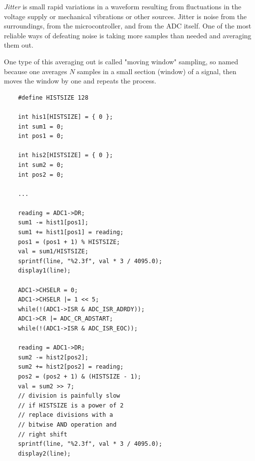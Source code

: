 \emph{Jitter} is small rapid variations in a waveform resulting from
fluctuations in the voltage supply or mechanical vibrations or other
sources. Jitter is noise from the surroundings, from the microcontroller,
and from the ADC itself. One of the most reliable ways of defeating noise
is taking more samples than needed and averaging them out.

One type of this averaging out is called "moving window" sampling, so named
because one averages $N$ samples in a small section (window) of a signal,
then moves the window by one and repeats the process.

\begin{lstlisting}
    #define HISTSIZE 128

    int his1[HISTSIZE] = { 0 };
    int sum1 = 0;
    int pos1 = 0;
    
    int his2[HISTSIZE] = { 0 };
    int sum2 = 0;
    int pos2 = 0;

    ... 

    reading = ADC1->DR;
    sum1 -= hist1[pos1];
    sum1 += hist1[pos1] = reading;
    pos1 = (pos1 + 1) % HISTSIZE;
    val = sum1/HISTSIZE;
    sprintf(line, "%2.3f", val * 3 / 4095.0);
    display1(line);

    ADC1->CHSELR = 0;
    ADC1->CHSELR |= 1 << 5;
    while(!(ADC1->ISR & ADC_ISR_ADRDY));
    ADC1->CR |= ADC_CR_ADSTART;
    while(!(ADC1->ISR & ADC_ISR_EOC));

    reading = ADC1->DR;
    sum2 -= hist2[pos2];
    sum2 += hist2[pos2] = reading;
    pos2 = (pos2 + 1) & (HISTSIZE - 1);
    val = sum2 >> 7;
    // division is painfully slow
    // if HISTSIZE is a power of 2
    // replace divisions with a 
    // bitwise AND operation and 
    // right shift
    sprintf(line, "%2.3f", val * 3 / 4095.0);
    display2(line);
\end{lstlisting}

